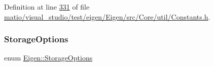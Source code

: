 Definition at line \hyperlink{matio_2visual__studio_2test_2eigen_2_eigen_2src_2_core_2util_2_constants_8h_source_l00331}{331} of file \hyperlink{matio_2visual__studio_2test_2eigen_2_eigen_2src_2_core_2util_2_constants_8h_source}{matio/visual\+\_\+studio/test/eigen/\+Eigen/src/\+Core/util/\+Constants.\+h}.

\mbox{\label{group__enums_gaacded1a18ae58b0f554751f6cdf9eb13}} 
\subsubsection{\texorpdfstring{Storage\+Options}{StorageOptions}\hspace{0.1cm}{\footnotesize\ttfamily [1/2]}}
{\footnotesize\ttfamily enum \hyperlink{group__enums_gaacded1a18ae58b0f554751f6cdf9eb13}{Eigen\+::\+Storage\+Options}}

